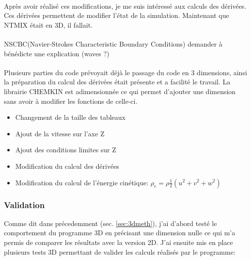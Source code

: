 \paragraph{}Après avoir réalisé ces modifications, je me suis intéressé aux calculs des dérivées. Ces dérivées permettent de modifier l'état de la simulation. Maintenant que NTMIX était en 3D, il fallait.

\paragraph{}NSCBC(Navier-Strokes Characteristic Boundary Conditions) demander à bénédicte une explication (waves ?) \cite{POINSOT1992104}

\paragraph{}Plusieurs parties du code prévoyait déjà le passage du code en 3 dimensions, ainsi la préparation du calcul des dérivées était présente et a facilité le travail. La librairie CHEMKIN est adimensionnée ce qui permet d'ajouter une dimension sans avoir à modifier les fonctions de celle-ci.

\begin{itemize}
\item Changement de la taille des tableaux
\item Ajout de la vitesse sur l'axe Z
\item Ajout des conditions limites sur Z
\item Modification du calcul des dérivées
\item Modification du calcul de l'énergie cinétique: $\rho_e = \rho\frac{1}{2}(u^2+v^2+w^2)$
\end{itemize}

\subsubsection{Validation}
Comme dit dans précedemment (sec. \ref{sec:3dmeth}), j'ai d'abord testé le comportement du programme 3D en précisant une dimension nulle ce qui m'a permis de comparer les résultats avec la version 2D. J'ai ensuite mis en place plusieurs tests 3D permettant de valider les calculs réalisés par le programme:

